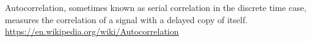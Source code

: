 \documentclass[a4paper]{article}
\title{}
\date{}
\author{Mohammad Rahmani}
\begin{document}
   \maketitle

  Autocorrelation, sometimes known as serial correlation in the discrete time case, measures the correlation of a signal with a delayed copy of itself. \url{https://en.wikipedia.org/wiki/Autocorrelation}

   
   
\end{document}
